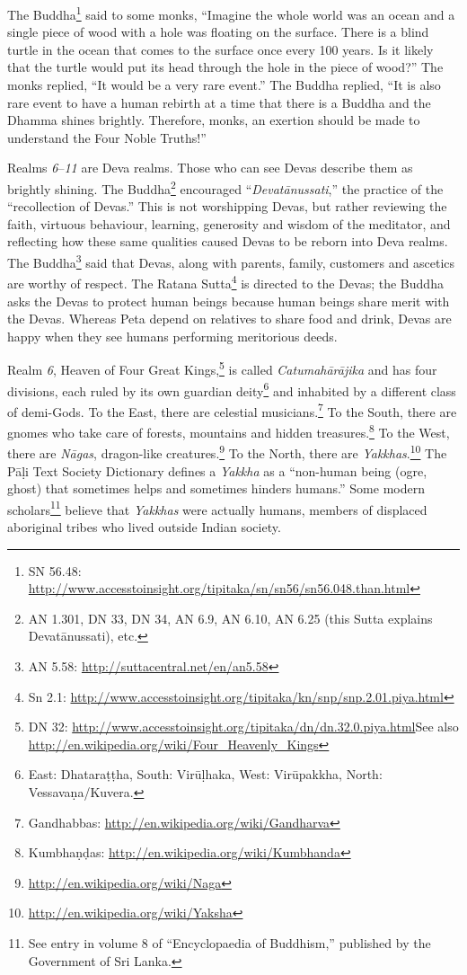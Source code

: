 The Buddha\footnote{SN 56.48: \url{http://www.accesstoinsight.org/tipitaka/sn/sn56/sn56.048.than.html}} said to some monks, “Imagine the whole world was an ocean and a single piece of wood with a hole was floating on the surface. There is a blind turtle in the ocean that comes to the surface once every 100 years. Is it likely that the turtle would put its head through the hole in the piece of wood?” The monks replied, “It would be a very rare event.” The Buddha replied, “It is also rare event to have a human rebirth at a time that there is a Buddha and the Dhamma shines brightly. Therefore, monks, an exertion should be made to understand the Four Noble Truths!”

Realms \textit{6}--\textit{11} are Deva realms. Those who can see Devas describe them as brightly shining. The Buddha\footnote{AN 1.301, DN 33, DN 34, AN 6.9, AN 6.10, AN 6.25 (this Sutta explains Devatānussati), etc.} encouraged “\textit{Devatānussati},” the practice of the “recollection of Devas.” This is not worshipping Devas, but rather reviewing the faith, virtuous behaviour, learning, generosity and wisdom of the meditator, and reflecting how these same qualities caused Devas to be reborn into Deva realms. The Buddha\footnote{AN 5.58: \url{http://suttacentral.net/en/an5.58}} said that Devas, along with parents, family, customers and ascetics are worthy of respect. The Ratana Sutta\footnote{Sn 2.1: \url{http://www.accesstoinsight.org/tipitaka/kn/snp/snp.2.01.piya.html}} is directed to the Devas; the Buddha asks the Devas to protect human beings because human beings share merit with the Devas. Whereas Peta depend on relatives to share food and drink, Devas are happy when they see humans performing meritorious deeds.

Realm \textit{6}, Heaven of Four Great Kings,\footnote{DN 32: \url{http://www.accesstoinsight.org/tipitaka/dn/dn.32.0.piya.html}\newline See also \url{http://en.wikipedia.org/wiki/Four_Heavenly_Kings}} is called \textit{Catumahārājika} and has four divisions, each ruled by its own guardian deity\footnote{East: Dhataraṭṭha, South: Virūḷhaka, West: Virūpakkha, North: Vessavaṇa/Kuvera.} and inhabited by a different class of demi-Gods. To the East, there are celestial musicians.\footnote{Gandhabbas: \url{http://en.wikipedia.org/wiki/Gandharva}} To the South, there are gnomes who take care of forests, mountains and hidden treasures.\footnote{Kumbhaṇḍas: \url{http://en.wikipedia.org/wiki/Kumbhanda}} To the West, there are \textit{Nāgas}, dragon-like creatures.\footnote{\url{http://en.wikipedia.org/wiki/Naga}} To the North, there are \textit{Yakkhas}.\footnote{\url{http://en.wikipedia.org/wiki/Yaksha}} The Pāḷi Text Society Dictionary defines a \textit{Yakkha} as a “non-human being (ogre, ghost) that sometimes helps and sometimes hinders humans.” Some modern scholars\footnote{See entry in volume 8 of “Encyclopaedia of Buddhism,” published by the Government of Sri Lanka.} believe that \textit{Yakkhas} were actually humans, members of displaced aboriginal tribes who lived outside Indian society.

